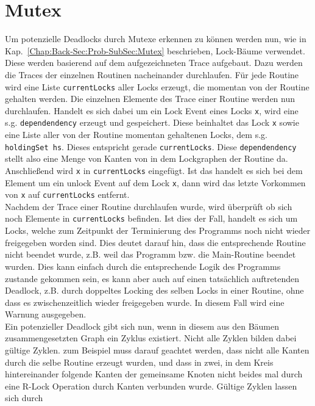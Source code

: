 \section{Mutex} \label{Chap:Implement-Sec:Mutex}
Um potenzielle Deadlocks durch Mutexe erkennen zu können werden nun, wie in 
Kap.~\ref{Chap:Back-Sec:Prob-SubSec:Mutex} beschrieben, Lock-Bäume verwendet.
Diese werden basierend auf dem aufgezeichneten Trace aufgebaut. Dazu werden die Traces der 
einzelnen Routinen nacheinander durchlaufen. Für jede Routine wird eine Liste \texttt{currentLocks} aller 
Locks erzeugt, die momentan von der Routine gehalten werden. Die einzelnen Elemente des Trace einer 
Routine werden nun durchlaufen. Handelt es sich dabei um ein Lock Event eines Locks \texttt{x}, 
wird eine s.g. \texttt{dependendency} erzeugt und gespeichert. Diese beinhaltet 
das Lock \texttt{x} sowie eine Liste aller von der Routine momentan gehaltenen 
Locks, dem s.g. \texttt{holdingSet hs}. Dieses entspricht gerade \texttt{currentLocks}. 
Diese \texttt{dependendency} stellt also 
eine Menge von Kanten von in dem Lockgraphen der Routine da. 
Anschließend wird \texttt{x} in \texttt{currentLocks} eingefügt.
Ist das handelt es sich bei dem Element um ein unlock Event auf dem Lock \texttt{x}, dann wird das 
letzte Vorkommen von \texttt{x} auf \texttt{currentLocks} entfernt.\\
Nachdem der Trace einer Routine durchlaufen wurde, wird überprüft ob sich noch Elemente in 
\texttt{currentLocks} befinden. Ist dies der Fall, handelt es sich um Locks, welche zum Zeitpunkt der Terminierung 
des Programms noch nicht wieder freigegeben worden sind. Dies deutet darauf hin, dass die
entsprechende Routine nicht beendet wurde, z.B. weil das Programm bzw. die Main-Routine beendet wurden.
Dies kann einfach durch die entsprechende Logik des Programms zustande gekommen sein, es kann aber auch 
auf einen tatsächlich auftretenden Deadlock, z.B. durch doppeltes Locking des selben Locks in einer Routine, ohne dass 
es zwischenzeitlich wieder freigegeben wurde. In diesem Fall wird eine Warnung ausgegeben.\\
Ein potenzieller Deadlock gibt sich nun, wenn in diesem aus den Bäumen zusammengesetzten 
Graph ein Zyklus existiert.
Nicht alle Zyklen bilden dabei gültige Zyklen. zum Beispiel muss darauf 
geachtet werden, dass nicht alle Kanten durch die selbe Routine erzeugt wurden, und dass in 
zwei, in dem Kreis hintereinander folgende Kanten der gemeinsame Knoten nicht beides mal durch eine 
R-Lock Operation durch Kanten verbunden wurde. Gültige Zyklen lassen sich durch 
